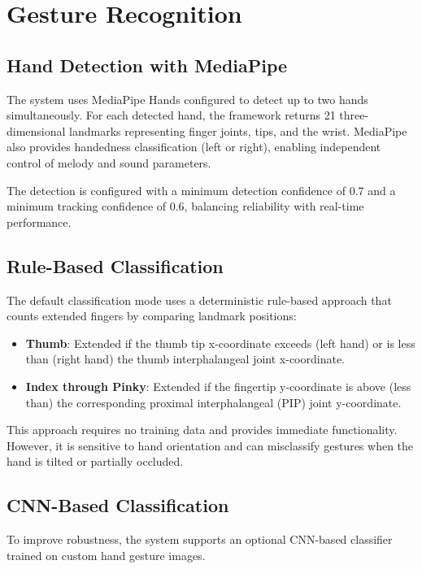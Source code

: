 \documentclass[conference]{IEEEtran}
\begin{document}
\section{Gesture Recognition}

\subsection{Hand Detection with MediaPipe}

The system uses MediaPipe Hands \cite{zhang2020mediapipe} configured to detect up to two hands simultaneously. For each detected hand, the framework returns 21 three-dimensional landmarks representing finger joints, tips, and the wrist. MediaPipe also provides handedness classification (left or right), enabling independent control of melody and sound parameters.

The detection is configured with a minimum detection confidence of 0.7 and a minimum tracking confidence of 0.6, balancing reliability with real-time performance.

\subsection{Rule-Based Classification}

The default classification mode uses a deterministic rule-based approach that counts extended fingers by comparing landmark positions:

\begin{itemize}
\item \textbf{Thumb}: Extended if the thumb tip x-coordinate exceeds (left hand) or is less than (right hand) the thumb interphalangeal joint x-coordinate.
\item \textbf{Index through Pinky}: Extended if the fingertip y-coordinate is above (less than) the corresponding proximal interphalangeal (PIP) joint y-coordinate.
\end{itemize}

This approach requires no training data and provides immediate functionality. However, it is sensitive to hand orientation and can misclassify gestures when the hand is tilted or partially occluded.

\subsection{CNN-Based Classification}

To improve robustness, the system supports an optional CNN-based classifier trained on custom hand gesture images.
\end{document}
